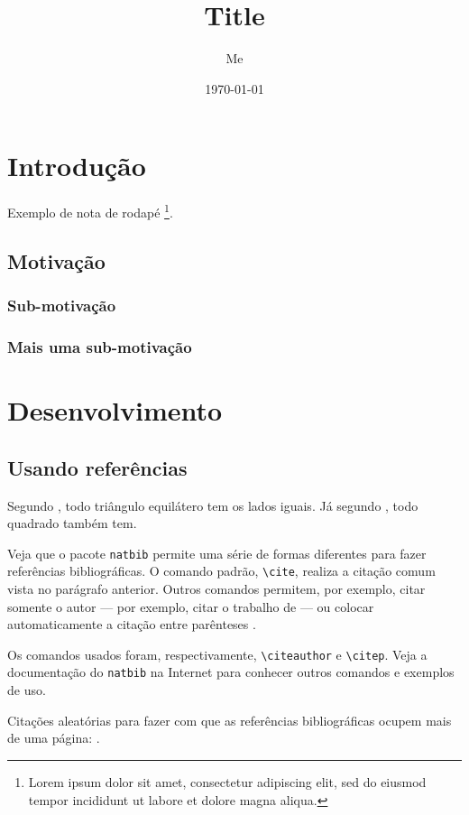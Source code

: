 \documentclass{ppgccufmg}
\title{Title}
\date{\today}
\author{Me}
\begin{document}
	\ppgccufmg
	
	\chapter{Introdução}
		Exemplo de nota de rodapé \footnote{Lorem ipsum dolor sit amet, consectetur adipiscing elit, sed do eiusmod tempor incididunt ut labore et dolore magna aliqua.}.
		\lipsum[1-4]
		
		\section{Motivação}
			\lipsum[4-5]
			   
			\subsection{Sub-motivação}
				\lipsum[6-7]
			\subsection{Mais uma sub-motivação}
				\lipsum[8-9]
				
	\chapter{Desenvolvimento}
		\lipsum[1-5]

		\section{Usando referências}
			Segundo \cite{horn86robot}, todo triângulo equilátero tem os lados iguais. Já segundo \cite{shashua97photometric}, todo quadrado também tem.
			
			Veja que o pacote \verb|natbib| permite uma série de formas diferentes para fazer referências bibliográficas. O comando padrão, \verb|\cite|, realiza a citação comum vista no parágrafo anterior. Outros comandos permitem, por exemplo, citar somente o autor --- por exemplo, citar o trabalho de	\citeauthor{samaras99coupled} --- ou colocar automaticamente a citação entre	parênteses \citep{hougen93estimation, sato99illumination2, sato99illumination1, sato01stability}.
			
			Os comandos usados foram, respectivamente, \verb|\citeauthor| e \verb|\citep|. Veja a documentação do \verb|natbib| na Internet para conhecer	outros comandos e exemplos de uso.
			
			Citações aleatórias para fazer com que as referências bibliográficas ocupem	mais de uma página: \cite{bichsel92simple, dror01statistics, guisser92new, dwork2006calibrating, sweeney2002k}.
			
		
		
		
\end{document}
